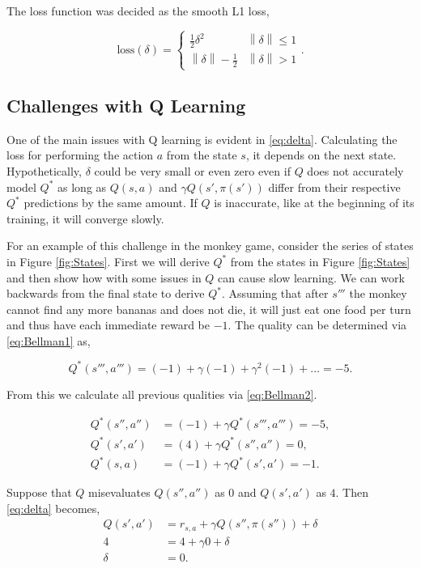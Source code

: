 \documentclass[%
 reprint,
nofootinbib,
 amsmath,amssymb,
 aps,
]{revtex4-1}
\newcommand{\abs}[1]{\left\|{#1}\right\|}
\begin{document}
The loss function was decided as the smooth L1 loss,

\begin{equation}
  \text{loss}(\delta) = \left\{ \begin{array}{cc} \frac{1}{2} \delta^2 & \abs{\delta} \leq 1 \\ \abs{\delta} - \frac{1}{2} & \abs{\delta} > 1\end{array}. \right. \label{eq:Loss}
\end{equation}

\subsection{\label{sec:Challenges}Challenges with Q Learning}
One of the main issues with Q learning is evident in \eqref{eq:delta}. Calculating the loss for performing the action $a$ from the state $s$, it depends on the next state. Hypothetically, $\delta$ could be very small or even zero even if $Q$ does not accurately model $Q^*$ as long as $Q(s,a)$ and $\gamma Q(s', \pi(s'))$ differ from their respective $Q^*$ predictions by the same amount. If $Q$ is inaccurate, like at the beginning of its training, it will converge slowly.

For an example of this challenge in the monkey game, consider the series of states in Figure \ref{fig:States}. First we will derive $Q^* $ from the states in Figure \ref{fig:States} and then show how with some issues in $Q$ can cause slow learning. We can work backwards from the final state to derive $Q^*$. Assuming that after $s'''$ the monkey cannot find any more bananas and does not die, it will just eat one food per turn and thus have each immediate reward be $-1$. The quality can be determined via \eqref{eq:Bellman1} as,

\begin{equation}
  Q^*(s''',a''') = (-1) + \gamma (-1) + \gamma^2 (-1) + \hdots = -5.
\end{equation}

From this we calculate all previous qualities via \eqref{eq:Bellman2}.

\begin{align}
  Q^*(s'',a'') &= (-1) + \gamma Q^*(s''',a''') = -5,\\
  Q^*(s',a') &= (4) + \gamma Q^*(s'',a'') = 0,\\
  Q^*(s,a) &= (-1) + \gamma Q^*(s',a') = -1.
\end{align}

Suppose that $Q$ misevaluates $Q(s'',a'')$ as 0 and $Q(s',a')$ as $4$. Then \eqref{eq:delta} becomes,
\begin{align*}
  Q(s',a') &= r_{s,a} + \gamma Q(s'', \pi(s'')) + \delta \\
  4 &= 4 + \gamma 0 + \delta \\
  \delta &= 0.
\end{align*}
\end{document}
